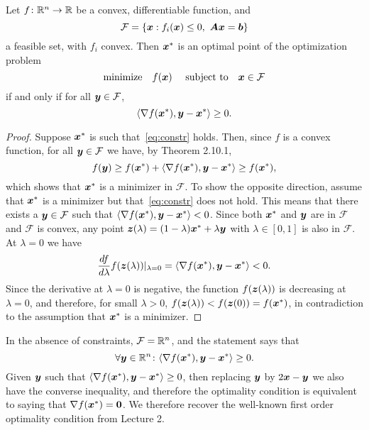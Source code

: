 \begin{theorem}
 Let $f\colon \mathbb{R}^n\to \mathbb{R}$ be a convex, differentiable function, and 
 \begin{equation*}
  \mathcal{F}=\{\vct{x} \mid f_i(\vct{x})\leq 0, \ \mtx{A}\vct{x}=\vct{b}\}
 \end{equation*}
a feasible set, with $f_i$ convex. Then $\bm{x}^*$ is an optimal point of the optimization problem
\begin{equation*}
 \text{minimize}\quad f(\bm{x}) \ \quad\text{subject to}\quad \bm{x}\in \mathcal{F}
\end{equation*}
if and only if for all $\bm{y}\in \mathcal{F}$, 
\begin{equation}\label{eq:opt}
 \langle {\nabla f(\bm{x}^*)}, {\bm{y}-\bm{x}^*} \rangle\geq 0.
\end{equation}
\end{theorem}

\begin{proof}
 Suppose $\bm{x}^*$ is such that~\eqref{eq:constr} holds. Then, since $f$ is a convex function,
 for all $\bm{y}\in \mathcal{F}$ we have, by Theorem 2.10.1,
 \begin{equation*}
  f(\bm{y})\geq f(\bm{x}^*)+\langle {\nabla f(\bm{x}^*)}, {\bm{y}-\bm{x}^*} \rangle \geq f(\bm{x}^*),
 \end{equation*}
which shows that $\bm{x}^*$ is a minimizer in $\mathcal{F}$. To show the opposite direction, assume that $\bm{x}^*$ is a minimizer but that~\eqref{eq:constr} does not hold. This means that there exists a $\bm{y}\in \mathcal{F}$ such that $\langle {\nabla f(\bm{x}^*)}, {\bm{y}-\bm{x}^*} \rangle<0$. Since both $\bm{x}^*$ and $\bm{y}$ are in $\mathcal{F}$ and $\mathcal{F}$ is convex, any point $\bm{z}(\lambda)=(1-\lambda)\bm{x}^*+\lambda\bm{y}$ with $\lambda\in [0,1]$ is also in $\mathcal{F}$. At $\lambda=0$ we have
\begin{equation*}
 \frac{df}{d\lambda}f(\bm{z}(\lambda))|_{\lambda=0} = \langle {\nabla f(\bm{x}^*)}, {\bm{y}-\bm{x}^*} \rangle<0.
\end{equation*}
Since the derivative at $\lambda=0$ is negative, the function $f(\bm{z}(\lambda))$ is decreasing at $\lambda=0$, and therefore, for small $\lambda>0$, $f(\bm{z}(\lambda))<f(\bm{z}(0))=f(\bm{x}^*)$, in contradiction to the assumption that $\bm{x}^*$ is a minimizer.
\end{proof}

\begin{example}
 In the absence of constraints, $\mathcal{F}=\mathbb{R}^n$, and the statement says that
 \begin{equation*}
  \forall \bm{y}\in \mathbb{R}^n\colon \langle {\nabla f(\bm{x}^*)}, {\bm{y}-\bm{x}^*} \rangle\geq 0.
 \end{equation*}
Given $\bm{y}$ such that $\langle {\nabla f(\bm{x}^*)}, {\bm{y}-\bm{x}^*} \rangle\geq 0$, then replacing $\bm{y}$ by $2\bm{x}-\bm{y}$ we also have the converse inequality, and therefore the optimality condition is equivalent to saying that $\nabla f(\bm{x}^*)=\bm{0}$. We therefore recover the well-known first order optimality condition from Lecture 2. 
\end{example}

